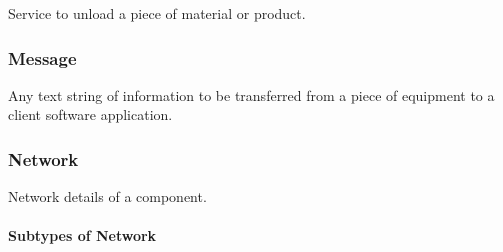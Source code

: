Service to unload a piece of material or product.


\subsubsection{Message}
\label{sec:Message}



Any text string of information to be transferred from a piece of equipment to a client software application.


\subsubsection{Network}
\label{sec:Network}



Network details of a component.


\paragraph{Subtypes of Network}\mbox{}
\label{sec:Subtypes of Network}

